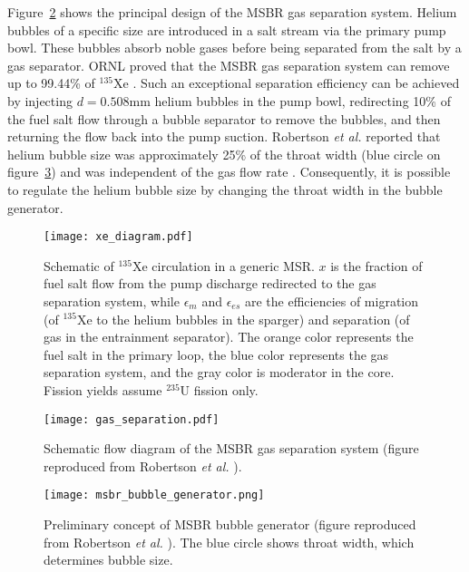 
Figure~\ref{fig:gas_removal_system} shows the principal design of the  
\gls{MSBR} gas separation system. Helium bubbles of a specific size are 
introduced in a salt stream via the primary pump bowl. These bubbles absorb 
noble gases before being separated from the salt by a gas separator. 
\gls{ORNL} proved that the \gls{MSBR} gas separation system can remove up to 
99.44\% of $^{135}$Xe \cite{briggs_molten-salt_1969}. Such an exceptional 
separation efficiency can be achieved by injecting 
$d=0.508$mm helium bubbles in the pump bowl, redirecting 10\% of the fuel salt flow
through a bubble separator to remove the bubbles, and then returning the flow back into the 
pump suction. Robertson \emph{et al.} reported that helium bubble size was 
approximately 25\% of the throat width (blue circle on 
figure~\ref{fig:bubble_separator}) and was independent of the gas flow rate 
\cite{robertson_conceptual_1971}. Consequently, it is possible to regulate the 
helium bubble size by changing the throat width in the bubble generator.
\begin{figure}[htp!] %
	\centering
	\texttt{[image: xe\_diagram.pdf]}
	\caption{Schematic of $^{135}$Xe circulation in a generic \gls{MSR}. 
	$x$ is the fraction of fuel salt flow from the pump discharge redirected to 
	the gas separation system, while $\epsilon_m$ and $\epsilon_{es}$ are the 
	efficiencies of 
	migration (of $^{135}$Xe to the helium bubbles in the sparger) and separation (of gas in 
	the entrainment separator).
	The orange color represents the 
	fuel salt in the primary loop,	the blue color represents the gas 
	separation system, and the gray color is moderator in the core. Fission 
	yields assume $^{235}$U fission only.}
	\label{fig:xe_diagram}
\end{figure}
\begin{figure}[htp!] %
  \centering
  \texttt{[image: gas\_separation.pdf]}
  \caption{Schematic flow diagram of the \gls{MSBR} gas separation system 
  (figure reproduced from Robertson \emph{et al.} 
  \cite{robertson_conceptual_1971}).}
  \label{fig:gas_removal_system}
\end{figure}
\begin{figure}[htp!] %
  \centering
  \texttt{[image: msbr\_bubble\_generator.png]}
  \caption{Preliminary concept of \gls{MSBR} bubble generator (figure 
  reproduced from Robertson \emph{et al.} \cite{robertson_conceptual_1971}). 
  The blue circle shows throat width, which determines bubble size.}
		\vspace{-0.25in}
  \label{fig:bubble_separator}
\end{figure}
